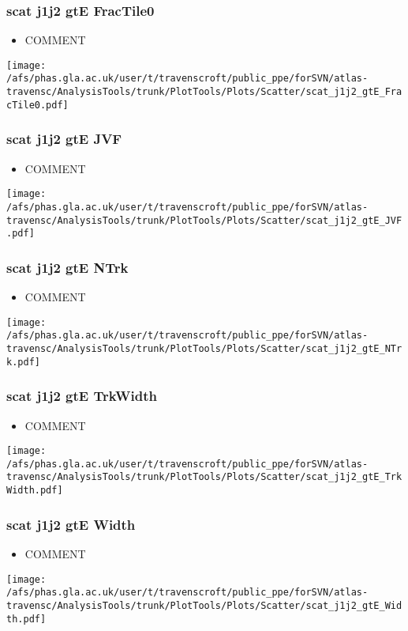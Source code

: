 \documentclass{beamer}
\begin{document}
\begin{frame}
\frametitle{scat j1j2 gtE FracTile0}
\begin{itemize}
\item COMMENT
\end{itemize}
\begin{center}
\texttt{[image: /afs/phas.gla.ac.uk/user/t/travenscroft/public\_ppe/forSVN/atlas-travensc/AnalysisTools/trunk/PlotTools/Plots/Scatter/scat\_j1j2\_gtE\_FracTile0.pdf]}
\end{center}
\end{frame}

\begin{frame}
\frametitle{scat j1j2 gtE JVF}
\begin{itemize}
\item COMMENT
\end{itemize}
\begin{center}
\texttt{[image: /afs/phas.gla.ac.uk/user/t/travenscroft/public\_ppe/forSVN/atlas-travensc/AnalysisTools/trunk/PlotTools/Plots/Scatter/scat\_j1j2\_gtE\_JVF.pdf]}
\end{center}
\end{frame}

\begin{frame}
\frametitle{scat j1j2 gtE NTrk}
\begin{itemize}
\item COMMENT
\end{itemize}
\begin{center}
\texttt{[image: /afs/phas.gla.ac.uk/user/t/travenscroft/public\_ppe/forSVN/atlas-travensc/AnalysisTools/trunk/PlotTools/Plots/Scatter/scat\_j1j2\_gtE\_NTrk.pdf]}
\end{center}
\end{frame}

\begin{frame}
\frametitle{scat j1j2 gtE TrkWidth}
\begin{itemize}
\item COMMENT
\end{itemize}
\begin{center}
\texttt{[image: /afs/phas.gla.ac.uk/user/t/travenscroft/public\_ppe/forSVN/atlas-travensc/AnalysisTools/trunk/PlotTools/Plots/Scatter/scat\_j1j2\_gtE\_TrkWidth.pdf]}
\end{center}
\end{frame}

\begin{frame}
\frametitle{scat j1j2 gtE Width}
\begin{itemize}
\item COMMENT
\end{itemize}
\begin{center}
\texttt{[image: /afs/phas.gla.ac.uk/user/t/travenscroft/public\_ppe/forSVN/atlas-travensc/AnalysisTools/trunk/PlotTools/Plots/Scatter/scat\_j1j2\_gtE\_Width.pdf]}
\end{center}
\end{frame}
\end{document}
